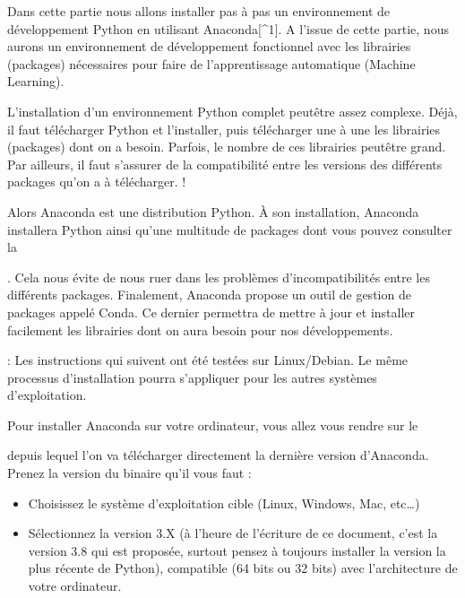 \documentclass[letterpaper,11pt,english]{sphinxmanual}
\begin{document}
\sphinxAtStartPar
Dans cette partie nous allons installer pas à pas un environnement de
développement Python en utilisant Anaconda{[}\textasciicircum{}1{]}. A l’issue de cette
partie, nous aurons un environnement de développement fonctionnel avec
les librairies (packages) nécessaires pour faire de l’apprentissage
automatique (Machine Learning).

\sphinxAtStartPar
{}

\sphinxAtStartPar
L’installation d’un environnement Python complet peut\sphinxhyphen{}être assez
complexe. Déjà, il faut télécharger Python et l’installer, puis
télécharger une à une les librairies (packages) dont on a besoin.
Parfois, le nombre de ces librairies peut\sphinxhyphen{}être grand. Par ailleurs, il
faut s’assurer de la compatibilité entre les versions des différents
packages qu’on a à télécharger. !

\sphinxAtStartPar
Alors Anaconda est une distribution Python. À son installation, Anaconda
installera Python ainsi qu’une multitude de packages dont vous pouvez
consulter la
%
\begin{footnote}[1]\sphinxAtStartFootnote
{}
%
\end{footnote}.
Cela nous évite de nous ruer dans les problèmes d’incompatibilités entre
les différents packages. Finalement, Anaconda propose un outil de
gestion de packages appelé Conda. Ce dernier permettra de mettre à jour
et installer facilement les librairies dont on aura besoin pour nos
développements.

\sphinxAtStartPar
{}

\sphinxAtStartPar
{}: Les instructions qui suivent ont été testées sur Linux/Debian.
Le même processus d’installation pourra s’appliquer pour les autres
systèmes d’exploitation.

\sphinxAtStartPar
Pour installer Anaconda sur votre ordinateur, vous allez vous rendre sur
le %
\begin{footnote}[2]\sphinxAtStartFootnote
{}
%
\end{footnote}
depuis lequel l’on va télécharger directement la dernière version
d’Anaconda. Prenez la version du binaire qu’il vous faut :
\begin{itemize}
\item {} 
\sphinxAtStartPar
Choisissez le système d’exploitation cible (Linux, Windows, Mac,
etc…)

\item {} 
\sphinxAtStartPar
Sélectionnez la version 3.X (à l’heure de l’écriture de ce document,
c’est la version 3.8 qui est proposée, surtout pensez à toujours
installer la version la plus récente de Python), compatible (64 bits
ou 32 bits) avec l’architecture de votre ordinateur.

\end{itemize}
\end{document}
